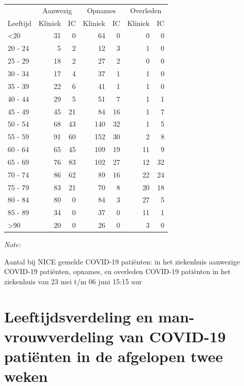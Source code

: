 \documentclass[
  english,
  man,floatsintext]{apa6}
\begin{document}
\begin{table}
\centering\begingroup\fontsize{10}{12}\selectfont

\begin{threeparttable}
\begin{tabular}{lrrrrrr}
\toprule
\multicolumn{1}{c}{ } & \multicolumn{2}{c}{Aanwezig} & \multicolumn{2}{c}{Opnames} & \multicolumn{2}{c}{Overleden} \\
\cmidrule(l{3pt}r{3pt}){2-3} \cmidrule(l{3pt}r{3pt}){4-5} \cmidrule(l{3pt}r{3pt}){6-7}
Leeftijd & Kliniek & IC & Kliniek & IC & Kliniek & IC\\
\midrule
<20 & 31 & 0 & 64 & 0 & 0 & 0\\
20 - 24 & 5 & 2 & 12 & 3 & 1 & 0\\
25 - 29 & 18 & 2 & 27 & 2 & 0 & 0\\
30 - 34 & 17 & 4 & 37 & 1 & 1 & 0\\
35 - 39 & 22 & 6 & 41 & 1 & 1 & 0\\
40 - 44 & 29 & 5 & 51 & 7 & 1 & 1\\
45 - 49 & 45 & 21 & 84 & 16 & 1 & 7\\
50 - 54 & 68 & 43 & 140 & 32 & 1 & 5\\
55 - 59 & 91 & 60 & 152 & 30 & 2 & 8\\
60 - 64 & 65 & 45 & 109 & 19 & 11 & 9\\
65 - 69 & 76 & 83 & 102 & 27 & 12 & 32\\
70 - 74 & 86 & 62 & 89 & 16 & 22 & 24\\
75 - 79 & 83 & 21 & 70 & 8 & 20 & 18\\
80 - 84 & 80 & 0 & 84 & 3 & 27 & 5\\
85 - 89 & 34 & 0 & 37 & 0 & 11 & 1\\
>90 & 20 & 0 & 26 & 0 & 3 & 0\\
\bottomrule
\end{tabular}
\begin{tablenotes}
\item \textit{Note: } 
\item Aantal bij NICE gemelde COVID-19 patiënten: in het ziekenhuis aanwezige COVID-19 patiënten, opnames, en overleden COVID-19 patiënten in het ziekenhuis van 23 mei t/m 06 juni 15:15 uur
\end{tablenotes}
\end{threeparttable}
\endgroup{}
\end{table}

\newpage

\hypertarget{leeftijdsverdeling-en-man-vrouwverdeling-van-covid-19-patiuxebnten-in-de-afgelopen-twee-weken}{%
\section{Leeftijdsverdeling en man-vrouwverdeling van COVID-19 patiënten in de afgelopen twee weken}\label{leeftijdsverdeling-en-man-vrouwverdeling-van-covid-19-patiuxebnten-in-de-afgelopen-twee-weken}}
\end{document}
